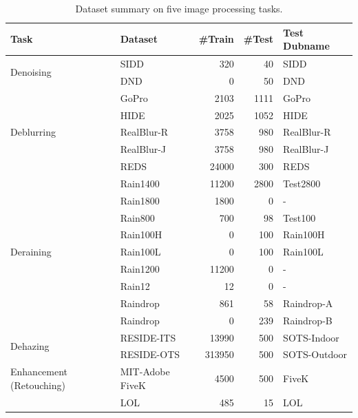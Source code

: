\documentclass[aps,prl,twocolumn,groupedaddress]{revtex4-2}
\begin{document}

\onecolumngrid


\begin{table}[ht]
\centering
\caption{Dataset summary on five image processing tasks.}
\begin{tabular}{|l|l|r|r|l|}
\hline
Task & Dataset & \#Train & \#Test & Test Dubname \\
\hline
\multirow{2}{*}{Denoising} 
  & SIDD \cite{} & 320  & 40  & SIDD \\
  & DND \cite{}  & 0    & 50  & DND \\
\hline
\multirow{5}{*}{Deblurring} 
  & GoPro \cite{}      & 2103  & 1111 & GoPro \\
  & HIDE \cite{}       & 2025  & 1052 & HIDE \\
  & RealBlur-R \cite{} & 3758  & 980  & RealBlur-R \\
  & RealBlur-J \cite{} & 3758  & 980  & RealBlur-J \\
  & REDS \cite{}       & 24000 & 300  & REDS \\
\hline
\multirow{9}{*}{Deraining}
  & Rain1400 \cite{} & 11200 & 2800 & Test2800 \\
  & Rain1800 \cite{} & 1800  & 0    & - \\
  & Rain800 \cite{}  & 700   & 98   & Test100 \\
  & Rain100H \cite{} & 0     & 100  & Rain100H \\
  & Rain100L \cite{} & 0     & 100  & Rain100L \\
  & Rain1200 \cite{} & 11200 & 0    & - \\
  & Rain12 \cite{}   & 12    & 0    & - \\
  & Raindrop \cite{} & 861   & 58   & Raindrop-A \\
  & Raindrop \cite{} & 0     & 239  & Raindrop-B \\
\hline
\multirow{2}{*}{Dehazing}
  & RESIDE-ITS \cite{} & 13990  & 500 & SOTS-Indoor \\
  & RESIDE-OTS \cite{} & 313950 & 500 & SOTS-Outdoor \\
\hline
Enhancement (Retouching) 
  & MIT-Adobe FiveK \cite{} & 4500 & 500 & FiveK \\
  & LOL \cite{}             & 485  & 15  & LOL \\
\hline
\end{tabular}
\end{table}
\end{document}
